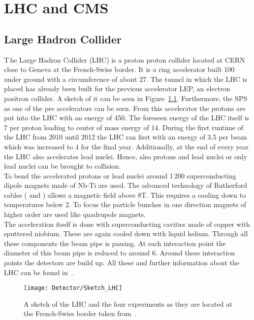 \chapter{LHC and CMS \label{sec:LHCCMS}}

\section{Large Hadron Collider \label{LHCCMSLHC}}

\lettrine[lines=2]{T}{\,}he Large Hadron Collider (LHC) is a proton proton collider located at CERN close to Geneva at the French-Swiss border. It is a ring accelerator built 100\m{} under ground with a circumference of about 27\km{}. The tunnel in which the LHC is placed has already been built for the previous accelerator LEP, an electron positron collider. A sketch of it can be seen in Figure~\ref{plot:LCHSketch}. Furthermore, the SPS as one of the pre accelerators can be seen. From this accelerator the protons are put into the LHC with an energy of 450\GeV{}. The foreseen energy of the LHC itself is 7\TeV{} per proton leading to center of mass energy of 14\TeV{}. During the first runtime of the LHC from 2010 until 2012 the LHC ran first with an energy of 3.5\TeV{} per beam which was increased to 4\TeV{} for the final year. Additionally, at the end of every year the LHC also accelerates lead nuclei. Hence, also protons and lead nuclei or only lead nuclei can be brought to collision. \\
To bend the accelerated protons or lead nuclei around 1\,200 superconducting dipole magnets made of Nb-Ti are used. The advanced technology of Rutherford cables (\cite{RuthCables1} and \cite{RuthCables2}) allows a magnetic field above 8\unit{T}. This requires a cooling down to temperatures below 2\K{}. To focus the particle bunches in one direction magnets of higher order are used like quadrupole magnets. \\
The acceleration itself is done with superconducting cavities made of copper with sputtered niobium. These are again cooled down with liquid helium. Through all these components the beam pipe is passing. At each interaction point the diameter of this beam pipe is reduced to around 6\cm{}. Around these interaction points the detectors are build up. All these and further information about the LHC can be found in~.

\begin{figure}[!ht]
  \centering
  \texttt{[image: Detector/Sketch\_LHC]}
  \caption[Sketch of the LHC]{A sketch of the LHC and the four experiments as they are located at the French-Swiss border taken from~\cite{Team:40525}. \label{plot:LCHSketch}}
\end{figure}


